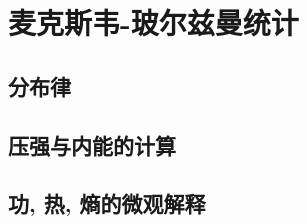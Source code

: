 

\section{麦克斯韦-玻尔兹曼统计}\label{14-4}

\subsection{分布律}\label{14-4-1}

\subsection{压强与内能的计算}\label{14-4-2}

\subsection{功, 热, 熵的微观解释}\label{14-4-3}